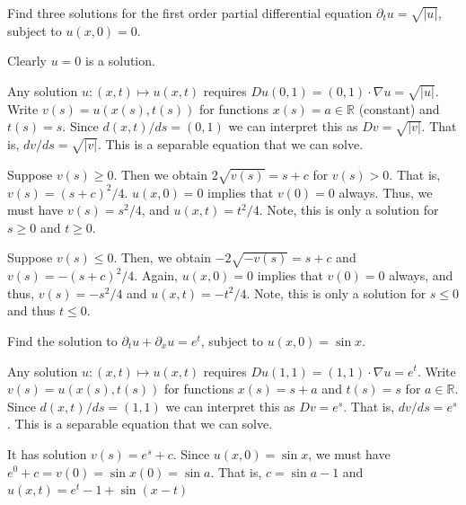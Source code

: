 \documentclass[12 pt, letterpaper]{hmcpset}
\begin{document}
\pagebreak

\begin{problem}[2.]
	Find three solutions for the first order partial differential equation $\partial_{t} u = \sqrt{\lvert u \rvert}$, subject to $u(x, 0) = 0$.
\end{problem}

\begin{solution}
	Clearly $u = 0$ is a solution.

	Any solution $u : (x, t) \mapsto u(x, t)$ requires $Du(0, 1) = (0, 1) \cdot \nabla u = \sqrt{\lvert u \rvert}$. Write $v(s) = u(x(s), t(s))$ for functions $x(s) = a \in \mathbb{R}$ (constant) and $t(s) = s$. Since $d(x, t) / ds = (0, 1)$ we can interpret this as $Dv = \sqrt{\lvert v \rvert}$. That is, $dv / ds = \sqrt{\lvert v \rvert}$. This is a separable equation that we can solve. 

	Suppose $v(s) \ge 0$. Then we obtain $2 \sqrt{v(s)} = s + c$ for $v(s) > 0$. That is, $v(s) = (s + c)^{2}/4$. $u(x, 0) = 0$ implies that $v(0) = 0$ always. Thus, we must have $v(s) = s^{2} / 4$, and $u(x, t) = t^{2} / 4$. Note, this is only a solution for $s \ge 0$ and $t \ge 0$.

	Suppose $v(s) \le 0$. Then, we obtain $-2 \sqrt{- v(s)} = s + c$ and $v(s) = -(s + c)^{2} / 4$. Again, $u(x, 0) = 0$ implies that $v(0) = 0$ always, and thus, $v(s) = - s^{2} / 4$ and $u(x, t) = - t^{2} / 4$. Note, this is only a solution for $s \le 0$ and thus $t \le 0$.
\end{solution}

\pagebreak

\begin{problem}[3.]
	Find the solution to $\partial_{t} u + \partial_{x} u = e^{t}$, subject to $u(x, 0) = \sin{x}$.
\end{problem}

\begin{solution}
	Any solution $u : (x, t) \mapsto u(x, t)$ requires $Du(1, 1) = (1, 1) \cdot \nabla u = e^{t}$. Write $v(s) = u(x(s), t(s))$ for functions $x(s) = s + a$ and $t(s) = s$ for $a \in \mathbb{R}$. Since $d(x, t) / ds = (1, 1)$ we can interpret this as $Dv = e^{s}$. That is, $dv / ds = e^{s}$. This is a separable equation that we can solve. 

	It has solution $v(s) = e^{s} + c$. Since $u(x, 0) = \sin{x}$, we must have $e^{0} + c = v(0) = \sin{x(0)} = \sin{a}$. That is, $c = \sin{a} - 1$ and $u(x, t) = e^{t} - 1 + \sin{(x - t)}$
\end{solution}
\end{document}
